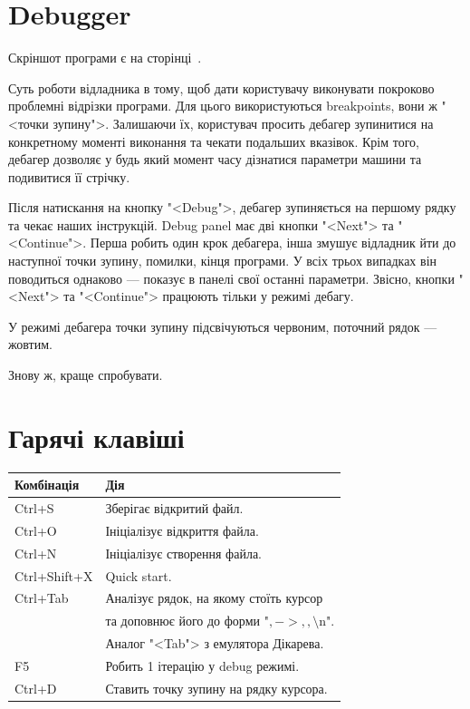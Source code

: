 \documentclass[oneside,final,14pt]{extreport}
\begin{document}
\newpage
\section{Debugger}
Скріншот програми є на сторінці \,\pageref{screenshot}.
\medskip

Суть роботи відладника в тому, щоб дати користувачу виконувати покроково проблемні відрізки програми. Для цього використуються breakpoints, вони ж "<точки зупину">. Залишаючи їх, користувач просить дебагер зупинитися на конкретному моменті виконання та чекати подальших вказівок. Крім того, дебагер дозволяє у будь який момент часу дізнатися параметри машини та подивитися її стрічку.

Після натискання на кнопку "<Debug">, дебагер зупиняється на першому рядку та чекає наших інструкцій. Debug panel має дві кнопки "<Next"> та "<Continue">. Перша робить один крок дебагера, інша змушує відладник йти до наступної точки зупину, помилки, кінця програми. У всіх трьох випадках він поводиться однаково --- показує в панелі свої останні параметри.
Звісно, кнопки "<Next"> та "<Continue"> працюють тільки у режимі дебагу.

У режимі дебагера точки зупину підсвічуються червоним, поточний рядок --- жовтим.

Знову ж, краще спробувати.
\section{Гарячі клавіші}
\label{sec:hotkeys}
\begin{tabular}{| l | l |}
	\hline
	Комбінація & Дія \\
	\hline
	Ctrl+S & Зберігає відкритий файл. \\
	\hline
	Ctrl+O & Ініціалізує відкриття файла. \\
	\hline
	Ctrl+N & Ініціалізує створення файла. \\
	\hline
	Ctrl+Shift+X & Quick start. \\
	\hline
	Ctrl+Tab & Аналізує рядок, на якому стоїть курсор \\
	 		 &  та доповнює його до форми "$,->,,\setminus$n".\\
			 & Аналог "<Tab"> з емулятора Дікарева.\\
	\hline
	F5 & Робить 1 ітерацію у debug режимі.\\
	\hline
	Ctrl+D & Ставить точку зупину на рядку курсора.\\
	\hline 
\end{tabular}
\bigskip
\end{document}
